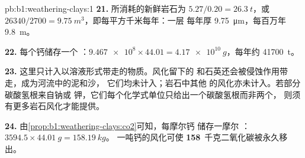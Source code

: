 \begin{solution}{pb:b1:weathering-clays:1}
\textbf{21.} 所消耗的新鲜岩石为 $5.27/0.20 = \qty{26.3}{t}$，或
$\num{26340}/2700 = \qty{9.75}{m^3}$，即每平方千米每年：一层
每年厚 \qty{9.75}{\micro m}，每百万年 \qty{9.8}{m}。

\textbf{22.} 每个钙储存一个 ：$\num{9.467e8} \times 44.01 =
\qty{4.17e10}{g}$，每年约 \qty{41700}{t}。

\textbf{23.} 这里只计入以溶液形式带走的物质。风化留下的
和石英还会被侵蚀作用带走，成为河流中的泥和沙，
它们均未计入；岩石中其他
的风化亦未计入。若部分碳酸氢根来自钠或
钾，它们每个化学式单位只给出一个碳酸氢根而非两个，
则须有更多岩石风化才能提供。

\textbf{24.} 由\cref{prop:b1:weathering-clays:co2}可知，每摩尔钙
储存一摩尔 ：$3594.5 \times \qty{44.01}{g} = \qty{158.19}{kg}$。
一吨钙的风化可使
\textbf{158}~千克二氧化碳被永久移出。
\end{solution}
